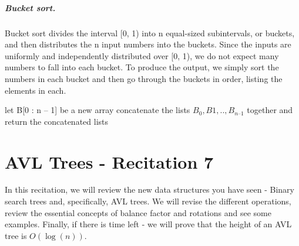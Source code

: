 \paragraph{Bucket sort.}
Bucket sort divides the interval [0, 1) into n equal-sized subintervals, or buckets, and then distributes the n input numbers into the buckets. Since the inputs are uniformly and independently distributed over [0, 1), we do not expect many numbers to fall into each bucket. To produce the output, we simply sort the numbers in each bucket and then go through the buckets in order, listing the elements in each.


  \begin{algorithm}[H]
    	let B[0 : n – 1] be a new array
	\For{ $i \leftarrow [1, n]$}{
	    insert $A_{i}$ into list $B_{ \lfloor n A_{i} \rfloor} ]$
       	}
	concatenate the lists $B_{0}, B{1}, .. , B_{n – 1}$ together and\\
	return the concatenated lists
  \end{algorithm}




\chapter{AVL Trees  - Recitation 7} 


    In this recitation, we will review the new data structures you have seen - Binary search trees and, specifically, AVL trees. We will revise the different operations, review the essential concepts of balance factor and rotations and see some examples. Finally, if there is time left - we will prove that the height of an AVL tree is $O(\log(n))$.
    
